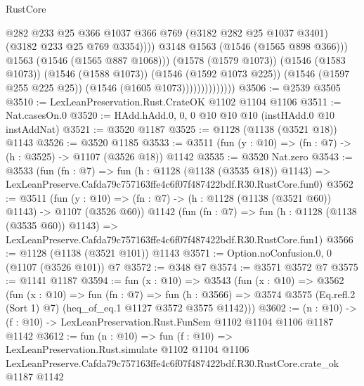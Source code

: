 \begin{lexlean}{RustCore}
\begin{coremodule}
                                      @282
                                      @233
                                      @25
                                      @366
                                      @1037
                                      @366
                                      @769
                                      (@3182 @282 @25 @1037 @3401)
                                      (@3182 @233 @25 @769 @3354))))
                                @3148
                                @1563
                                (@1546 (@1565 @898 @366)))
                              @1563
                              (@1546 (@1565 @887 @1068)))
                            (@1578 (@1579 @1073))
                            (@1546 (@1583 @1073))
                            (@1546 (@1588 @1073))
                            (@1546 (@1592 @1073 @225))
                            (@1546 (@1597 @255 @225 @25))
                            (@1546 (@1605 @1073))))))))))))))
@3506 := @2539 @3505
@3510 := LexLeanPreservation.Rust.CrateOK @1102 @1104 @1106
@3511 := Nat.casesOn.{0}
@3520 := HAdd.hAdd.{0, 0, 0} @10 @10 @10 (instHAdd.{0} @10 instAddNat)
@3521 := @3520 @1187
@3525 := @1128 (@1138 (@3521 @18)) @1143
@3526 := @3520 @1185
@3533 := @3511 (fun (y : @10) => (fn : @7) -> (h : @3525) -> @1107 (@3526 @18)) @1142
@3535 := @3520 Nat.zero
@3543 := @3533
    (fun (fn : @7) =>
    fun (h : @1128 (@1138 (@3535 @18)) @1143) =>
    LexLeanPreserve.Cafda79c757163ffe4c6f07f487422bdf.R30.RustCore.fun0)
@3562 := @3511
    (fun (y : @10) => (fn : @7) -> (h : @1128 (@1138 (@3521 @60)) @1143) -> @1107 (@3526 @60))
    @1142
    (fun (fn : @7) =>
    fun (h : @1128 (@1138 (@3535 @60)) @1143) =>
    LexLeanPreserve.Cafda79c757163ffe4c6f07f487422bdf.R30.RustCore.fun1)
@3566 := @1128 (@1138 (@3521 @101)) @1143
@3571 := Option.noConfusion.{0, 0} (@1107 (@3526 @101)) @7
@3572 := @348 @7
@3574 := @3571 @3572 @7
@3575 := @1141 @1187
@3594 := fun (x : @10) =>
  @3543
    (fun (x : @10) =>
    @3562
      (fun (x : @10) =>
      fun (fn : @7) =>
      fun (h : @3566) =>
      @3574 @3575 (Eq.refl.{2} (Sort 1) @7) (heq_of_eq.{1} @1127 @3572 @3575 @1142)))
@3602 := (n : @10) -> (f : @10) -> LexLeanPreservation.Rust.FunSem @1102 @1104 @1106 @1187 @1142
@3612 := fun (n : @10) =>
  fun (f : @10) =>
  LexLeanPreservation.Rust.simulate
    @1102
    @1104
    @1106
    LexLeanPreserve.Cafda79c757163ffe4c6f07f487422bdf.R30.RustCore.crate_ok
    @1187
    @1142
\end{coremodule}
\end{lexlean}
